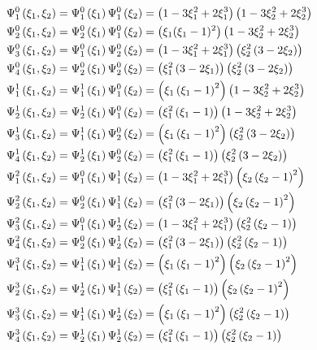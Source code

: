 \begin{equation}
  \begin{split}
    \chbfn{1}{0}{\xione,\xitwo}&=\chbfn{1}{0}{\xione}\chbfn{1}{0}{\xitwo}=\pbrac{1-3\xione^{2}+2\xione^{3}}\pbrac{1-3\xitwo^{2}+2\xitwo^{3}}\\
    \chbfn{2}{0}{\xione,\xitwo}&=\chbfn{2}{0}{\xione}\chbfn{1}{0}{\xitwo}=\pbrac{\xione(\xione-1)^{2}}\pbrac{1-3\xitwo^{2}+2\xitwo^{3}}\\
    \chbfn{3}{0}{\xione,\xitwo}&=\chbfn{1}{0}{\xione}\chbfn{2}{0}{\xitwo}=\pbrac{1-3\xione^{2}+2\xione^{3}}\pbrac{\xitwo^{2}\pbrac{3-2\xitwo}}\\
    \chbfn{4}{0}{\xione,\xitwo}&=\chbfn{2}{0}{\xione}\chbfn{2}{0}{\xitwo}=\pbrac{\xione^{2}\pbrac{3-2\xione}}\pbrac{\xitwo^{2}\pbrac{3-2\xitwo}}\\
    \chbfn{1}{1}{\xione,\xitwo}&=\chbfn{1}{1}{\xione}\chbfn{1}{0}{\xitwo}=\pbrac{\xione\pbrac{\xione-1}^{2}}\pbrac{1-3\xitwo^{2}+2\xitwo^{3}}\\
    \chbfn{2}{1}{\xione,\xitwo}&=\chbfn{2}{1}{\xione}\chbfn{1}{0}{\xitwo}=\pbrac{\xione^{2}\pbrac{\xione-1}}\pbrac{1-3\xitwo^{2}+2\xitwo^{3}}\\
    \chbfn{3}{1}{\xione,\xitwo}&=\chbfn{1}{1}{\xione}\chbfn{2}{0}{\xitwo}=\pbrac{\xione\pbrac{\xione-1}^{2}}\pbrac{\xitwo^{2}\pbrac{3-2\xitwo}}\\
    \chbfn{4}{1}{\xione,\xitwo}&=\chbfn{2}{1}{\xione}\chbfn{2}{0}{\xitwo}=\pbrac{\xione^{2}\pbrac{\xione-1}}\pbrac{\xitwo^{2}\pbrac{3-2\xitwo}}\\
    \chbfn{1}{2}{\xione,\xitwo}&=\chbfn{1}{0}{\xione}\chbfn{1}{1}{\xitwo}=\pbrac{1-3\xione^{2}+2\xione^{3}}\pbrac{\xitwo\pbrac{\xitwo-1}^{2}}\\
    \chbfn{2}{2}{\xione,\xitwo}&=\chbfn{2}{0}{\xione}\chbfn{1}{1}{\xitwo}=\pbrac{\xione^{2}\pbrac{3-2\xione}}\pbrac{\xitwo\pbrac{\xitwo-1}^{2}}\\
    \chbfn{3}{2}{\xione,\xitwo}&=\chbfn{1}{0}{\xione}\chbfn{2}{1}{\xitwo}=\pbrac{1-3\xione^{2}+2\xione^{3}}\pbrac{\xitwo^{2}\pbrac{\xitwo-1}}\\
    \chbfn{4}{2}{\xione,\xitwo}&=\chbfn{2}{0}{\xione}\chbfn{2}{1}{\xitwo}=\pbrac{\xione^{2}\pbrac{3-2\xione}}\pbrac{\xitwo^{2}\pbrac{\xitwo-1}}\\
    \chbfn{1}{3}{\xione,\xitwo}&=\chbfn{1}{1}{\xione}\chbfn{1}{1}{\xitwo}=\pbrac{\xione\pbrac{\xione-1}^{2}}\pbrac{\xitwo\pbrac{\xitwo-1}^{2}}\\
    \chbfn{2}{3}{\xione,\xitwo}&=\chbfn{2}{1}{\xione}\chbfn{1}{1}{\xitwo}=\pbrac{\xione^{2}\pbrac{\xione-1}}\pbrac{\xitwo\pbrac{\xitwo-1}^{2}}\\
    \chbfn{3}{3}{\xione,\xitwo}&=\chbfn{1}{1}{\xione}\chbfn{2}{1}{\xitwo}=\pbrac{\xione\pbrac{\xione-1}^{2}}\pbrac{\xitwo^{2}\pbrac{\xitwo-1}}\\
    \chbfn{4}{3}{\xione,\xitwo}&=\chbfn{2}{1}{\xione}\chbfn{2}{1}{\xitwo}=\pbrac{\xione^{2}\pbrac{\xione-1}}\pbrac{\xitwo^{2}\pbrac{\xitwo-1}}    
  \end{split}
  \label{eqn:BicubicHermBFuns}
\end{equation}

